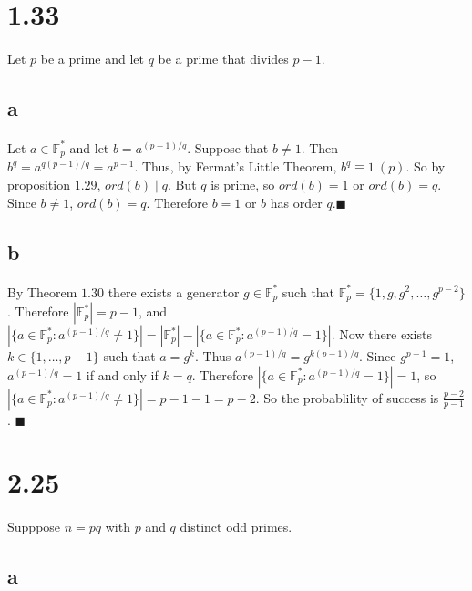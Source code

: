 \documentclass[letterpaper,12pt,oneside,onecolumn]{report}
\begin{document}
\section*{1.33}
\paragraph{}
Let $p$ be a prime and let $q$ be a prime that divides $p-1$.
\subsection*{a}
\paragraph{}
Let $a \in \mathbb{F}^*_p$ and let $b = a^{(p-1)/q}$. Suppose that $b \neq 1$. Then $b^q = a^{q(p-1)/q} = a^{p-1}$. Thus, by Fermat's Little Theorem, $b^q \equiv 1\ (p)$. So by proposition $1.29$, $ord(b) \mid q$. But $q$ is prime, so $ord(b) = 1$ or $ord(b) = q$. Since $b \neq 1$, $ord(b) = q$. Therefore $b = 1$ or $b$ has order $q$.$\blacksquare$
\subsection*{b}
\paragraph{}
By Theorem $1.30$ there exists a generator $g \in \mathbb{F}_p^*$ such that $\mathbb{F}_p^* = \{1, g, g^2,\dots,g^{p-2} \}$. Therefore $|\mathbb{F}_p^*| = p - 1$, and $|\{a \in \mathbb{F}_p^*: a^{(p-1)/q} \neq 1\}| = |\mathbb{F}^*_p| - |\{a \in \mathbb{F}^*_p : a^{(p-1)/q} = 1\}|$. Now there exists $k \in \{1, \dots, p-1\}$ such that $a = g^k$. Thus $a^{(p-1)/q} = g^{k(p-1)/q}$. Since $g^{p-1} = 1$, $a^{(p-1)/q} = 1$ if and only if $k = q$. Therefore $|\{a \in \mathbb{F}^*_p : a^{(p-1)/q} = 1\}| = 1$, so $|\{a \in \mathbb{F}_p^*: a^{(p-1)/q} \neq 1\}| = p - 1 - 1 = p - 2$. So the probablility of success is $\frac{p-2}{p-1}$. $\blacksquare$
\section*{2.25}
\paragraph{}
Supppose $n = pq$ with $p$ and $q$ distinct odd primes.
\subsection*{a}
\end{document}
